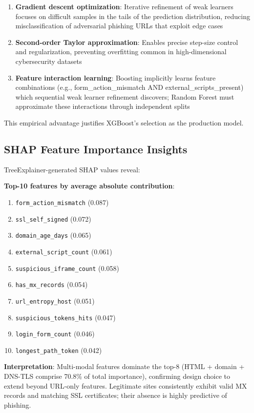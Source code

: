 \documentclass[conference]{IEEEtran}
\begin{document}
\begin{enumerate}
\item \textbf{Gradient descent optimization}: Iterative refinement of weak learners focuses on difficult samples in the tails of the prediction distribution, reducing misclassification of adversarial phishing URLs that exploit edge cases

\item \textbf{Second-order Taylor approximation}: Enables precise step-size control and regularization, preventing overfitting common in high-dimensional cybersecurity datasets

\item \textbf{Feature interaction learning}: Boosting implicitly learns feature combinations (e.g., form\_action\_mismatch AND external\_scripts\_present) which sequential weak learner refinement discovers; Random Forest must approximate these interactions through independent splits
\end{enumerate}

This empirical advantage justifies XGBoost's selection as the production model.

\subsection{SHAP Feature Importance Insights}

TreeExplainer-generated SHAP values reveal:

\textbf{Top-10 features by average absolute contribution}:
\begin{enumerate}
\item \texttt{form\_action\_mismatch} (0.087)
\item \texttt{ssl\_self\_signed} (0.072)
\item \texttt{domain\_age\_days} (0.065)
\item \texttt{external\_script\_count} (0.061)
\item \texttt{suspicious\_iframe\_count} (0.058)
\item \texttt{has\_mx\_records} (0.054)
\item \texttt{url\_entropy\_host} (0.051)
\item \texttt{suspicious\_tokens\_hits} (0.047)
\item \texttt{login\_form\_count} (0.046)
\item \texttt{longest\_path\_token} (0.042)
\end{enumerate}

\textbf{Interpretation}: Multi-modal features dominate the top-8 (HTML + domain + DNS-TLS comprise 70.8\% of total importance), confirming design choice to extend beyond URL-only features. Legitimate sites consistently exhibit valid MX records and matching SSL certificates; their absence is highly predictive of phishing.
\end{document}

